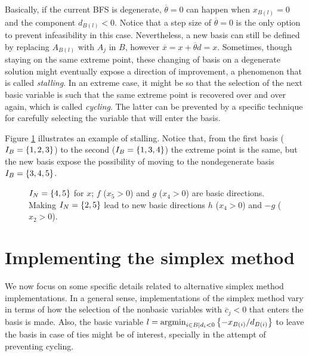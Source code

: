 Basically, if the current BFS is degenerate, $\overline{\theta} = 0$ can happen when $x_{B(l)} = 0$ and the component $d_{B(l)} < 0$. Notice that a step size of $\overline{\theta} = 0$ is the only option to prevent infeasibility in this case. Nevertheless, a new basis can still be defined by replacing $A_{B(l)}$ with $A_j$ in $B$, however $\overline{x} = x + \overline{\theta}d = x$. Sometimes, though staying on the same extreme point, these changing of basis on a degenerate solution might eventually expose a direction of improvement, a phenomenon that is called \emph{stalling}. In an extreme case, it might be so that the selection of the next basic variable is such that the same extreme point is recovered over and over again, which is called \emph{cycling}. The latter can be prevented by a specific technique for carefully selecting the variable that will enter the basis. 

Figure \ref{p1c4:fig:degenerate_basis} illustrates an example of stalling. Notice that, from the first basis ($I_B = \left\{ 1,2,3 \right \}$) to the second ($I_B = \left\{ 1,3,4 \right \}$) the extreme point is the same, but the new basis expose the possibility of moving to the nondegenerate basis $I_B=\left\{ 3,4,5 \right \}$.

\begin{figure}[h]
	\caption{ $I_N = \left\{ 4,5 \right \}$ for $x$; $f$ ($x_5 > 0$) and $g$ ($x_4 >0$) are basic directions. Making $I_N = \left\{ 2,5 \right \}$ lead to new basic directions $h$ ($x_4 > 0$) and $-g$ ($x_2 > 0$).} \label{p1c4:fig:degenerate_basis}
\end{figure}


\section{Implementing the simplex method}

We now focus on some specific details related to alternative simplex method implementations. In a general sense, implementations of the simplex method vary in terms of how the selection of the nonbasic variables with $\overline{c}_j < 0$ that enters the basis is made. Also, the basic variable $l = \mathop{\rm argmin}_{i \in B \mid d_i <0}\left\{ -x_{B(i)}/d_{B(i)} \right \}$ to leave the basis in case of ties might be of interest, specially in the attempt of preventing cycling.

